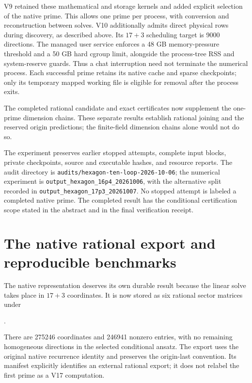 \documentclass[11pt]{article}
\begin{document}
V9 retained these mathematical and storage kernels and added explicit
selection of the native prime. This allows one prime per process, with
conversion and reconstruction between solves. V10 additionally admits direct physical rows during discovery, as described
above. Its $17+3$ scheduling target is 9000 directions. The managed
user service enforces
a 48 GB memory-pressure threshold and a 50 GB hard cgroup limit, alongside
the process-tree RSS and system-reserve guards. Thus a chat interruption
need not terminate the numerical process. Each successful prime retains
its native cache and sparse checkpoints; only its temporary mapped working
file is eligible for removal after the process exits.

The completed rational candidate and exact certificates now supplement the
one-prime dimension chains. These separate results establish rational
joining and the reserved origin predictions; the finite-field dimension
chains alone would not do so.

The experiment preserves earlier stopped attempts, complete input blocks,
private checkpoints, source and executable hashes, and resource reports.
The audit directory is
\texttt{audits/hexagon-ten-loop-2026-10-06}; the numerical experiment is
\texttt{output\_hexagon\_16p4\_20261006}, with the alternative split
recorded in \texttt{output\_hexagon\_17p3\_20261007}. No stopped attempt is labeled a
completed native prime. The completed result has the conditional certification scope stated in the
abstract and in the final verification receipt.


\section{The native rational export and reproducible benchmarks}
The native representation deserves its own durable result because the
linear solve takes place in $17+3$ coordinates. It is now stored as six
rational sector matrices under
\begin{center}
.
\end{center}
There are 275246 coordinates and 246941 nonzero entries, with no remaining
homogeneous directions in the selected conditional ansatz. The export uses
the original native recurrence identity and preserves the origin-last
convention. Its manifest explicitly identifies an external rational export;
it does not relabel the first prime as a V17 computation.
\end{document}
